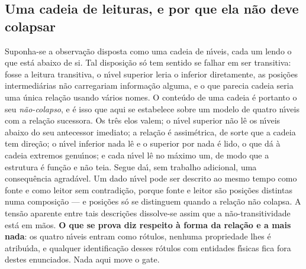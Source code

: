 \documentclass[11pt]{article}
\theoremstyle{definition}\newtheorem{deriv}{Derivação}
\begin{document}
\subsection*{Uma cadeia de leituras, e por que ela n\~ao deve colapsar}Suponha-se a observa\c{c}\~ao disposta como uma cadeia de n\'\i{}veis, cada um lendo o que est\'a abaixo de si. Tal disposi\c{c}\~ao s\'o tem sentido se falhar em ser transitiva: fosse a leitura transitiva, o n\'\i{}vel superior leria o inferior diretamente, as posi\c{c}\~oes intermedi\'arias n\~ao carregariam informa\c{c}\~ao alguma, e o que parecia cadeia seria uma \'unica rela\c{c}\~ao usando v\'arios nomes. O conte\'udo de uma cadeia \'e portanto o seu \emph{n\~ao-colapso}, e \'e isso que aqui se estabelece sobre um modelo de quatro n\'\i{}veis com a rela\c{c}\~ao sucessora. Os tr\^es elos valem; o n\'\i{}vel superior n\~ao l\^e os n\'\i{}veis abaixo do seu antecessor imediato; a rela\c{c}\~ao \'e assim\'etrica, de sorte que a cadeia tem dire\c{c}\~ao; o n\'\i{}vel inferior nada l\^e e o superior por nada \'e lido, o que d\'a \`a cadeia extremos genu\'\i{}nos; e cada n\'\i{}vel l\^e no m\'aximo um, de modo que a estrutura \'e fun\c{c}\~ao e n\~ao teia. Segue da\'\i{}, sem trabalho adicional, uma consequ\^encia agrad\'avel. Um dado n\'\i{}vel pode ser descrito ao mesmo tempo como fonte e como leitor sem contradi\c{c}\~ao, porque fonte e leitor s\~ao posi\c{c}\~oes distintas numa composi\c{c}\~ao --- e posi\c{c}\~oes s\'o se distinguem quando a rela\c{c}\~ao n\~ao colapsa. A tens\~ao aparente entre tais descri\c{c}\~oes dissolve-se assim que a n\~ao-transitividade est\'a em m\~aos. \textbf{O que se prova diz respeito \`a forma da rela\c{c}\~ao e a mais nada}: os quatro n\'\i{}veis entram como r\'otulos, nenhuma propriedade lhes \'e atribu\'\i{}da, e qualquer identifica\c{c}\~ao desses r\'otulos com entidades f\'\i{}sicas fica fora destes enunciados. Nada aqui move o gate.
\end{document}
